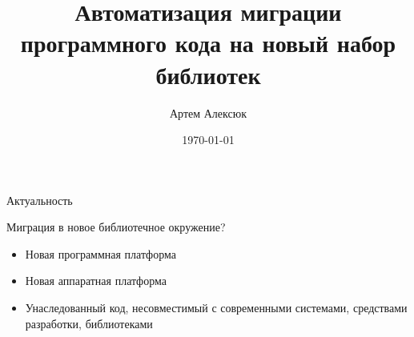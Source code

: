 \documentclass[12pt]{beamer}
\title{Автоматизация миграции программного кода на новый набор библиотек}
\date{\today}
\author{Артем Алексюк}
\institute{Санкт-Петербургский политехнический университет Петра Великого}
\begin{document}
\maketitle




{
\begin{frame}{Актуальность}
\begin{mybox}[]
Миграция в новое библиотечное окружение?
\begin{itemize}
	\item Новая программная платформа
	\item Новая аппаратная платформа
	\item Унаследованный код, несовместимый с современными системами, средствами разработки, библиотеками
\end{itemize}
\end{mybox}
\end{frame}
}
\end{document}
